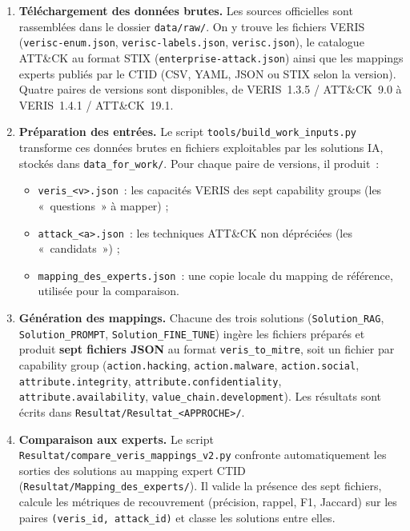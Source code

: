 \documentclass[a4paper,12pt]{article}
\begin{document}
\begin{enumerate}
    \item \textbf{Téléchargement des données brutes.}
          Les sources officielles sont rassemblées dans le dossier \texttt{data/raw/}.
          On y trouve les fichiers VERIS (\texttt{verisc-enum.json}, \texttt{verisc-labels.json},
          \texttt{verisc.json}), le catalogue ATT\&CK au format STIX
          (\texttt{enterprise-attack.json}) ainsi que les mappings experts publiés par le CTID
          (CSV, YAML, JSON ou STIX selon la version). Quatre paires de versions sont
          disponibles, de VERIS~1.3.5 / ATT\&CK~9.0 à VERIS~1.4.1 / ATT\&CK~19.1.

    \item \textbf{Préparation des entrées.}
          Le script \texttt{tools/build\_work\_inputs.py} transforme ces données brutes en
          fichiers exploitables par les solutions IA, stockés dans \texttt{data\_for\_work/}.
          Pour chaque paire de versions, il produit~:
          \begin{itemize}
              \item \texttt{veris\_<v>.json}~: les capacités VERIS des sept capability groups
                    (les «~questions~» à mapper) ;
              \item \texttt{attack\_<a>.json}~: les techniques ATT\&CK non dépréciées
                    (les «~candidats~») ;
              \item \texttt{mapping\_des\_experts.json}~: une copie locale du mapping de
                    référence, utilisée pour la comparaison.
          \end{itemize}

    \item \textbf{Génération des mappings.}
          Chacune des trois solutions (\texttt{Solution\_RAG}, \texttt{Solution\_PROMPT},
          \texttt{Solution\_FINE\_TUNE}) ingère les fichiers préparés et produit
          \textbf{sept fichiers JSON} au format \texttt{veris\_to\_mitre}, soit un fichier par
          capability group (\texttt{action.hacking}, \texttt{action.malware},
          \texttt{action.social}, \texttt{attribute.integrity},
          \texttt{attribute.confidentiality}, \texttt{attribute.availability},
          \texttt{value\_chain.development}). Les résultats sont écrits dans
          \texttt{Resultat/Resultat\_<APPROCHE>/}.

    \item \textbf{Comparaison aux experts.}
          Le script \texttt{Resultat/compare\_veris\_mappings\_v2.py} confronte automatiquement
          les sorties des solutions au mapping expert CTID
          (\texttt{Resultat/Mapping\_des\_experts/}). Il valide la présence des sept fichiers,
          calcule les métriques de recouvrement (précision, rappel, F1, Jaccard) sur les paires
          \texttt{(veris\_id, attack\_id)} et classe les solutions entre elles.
\end{enumerate}
\end{document}
